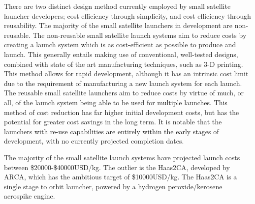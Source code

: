    There are two distinct design method currently employed by small satellite launcher developers; cost efficiency through simplicity, and cost efficiency through reusability. The majority of the small satellite launchers in development are non-reusable. The non-reusable small satellite launch systems aim to reduce costs by creating a launch system which is as cost-efficient as possible to produce and launch. This generally entails making use of conventional, well-tested designs, combined with state of the art manufacturing techniques, such as 3-D printing. This method allows for rapid development, although it has an intrinsic cost limit due to the requirement of manufacturing a new launch system for each launch.  The reusable small satellite launchers aim to reduce costs by virtue of much, or all, of the launch system being able to be used for multiple launches. This method of cost reduction has far higher initial development costs, but has the potential for greater cost savings in the long term. It is notable that the launchers with re-use capabilities are entirely within the early stages of development, with no currently projected completion dates. 
   
   The majority of the small satellite launch systems have projected launch costs between \$20000-\$40000USD/kg. The outlier is the Haas2CA\cite{ARCA}, developed by ARCA, which has the ambitious target of \$10000USD/kg. The Haas2CA is a single stage to orbit launcher, powered by a hydrogen peroxide/kerosene aerospike engine. 

